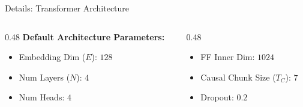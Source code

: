 \documentclass[8pt,hyperref={pdfpagelabels=true},xcolor=table,aspectratio=169]{beamer}
\begin{document}
\begin{frame}{Details: Transformer Architecture}
    \vspace{1.0em}
    \begin{columns}[T]
        \begin{column}{0.48\textwidth}
            \textbf{Default Architecture Parameters:}
            \begin{itemize}
                \item Embedding Dim ($E$): $128$
                \item Num Layers ($N$): $4$
                \item Num Heads: $4$
            \end{itemize}
        \end{column}
        \begin{column}{0.48\textwidth}
            \vspace{1.2em}
            \begin{itemize}
                \item FF Inner Dim: $1024$
                \item Causal Chunk Size ($T_C$): $7$
                \item Dropout: $0.2$
            \end{itemize}
        \end{column}
    \end{columns}
\end{frame}
\end{document}
